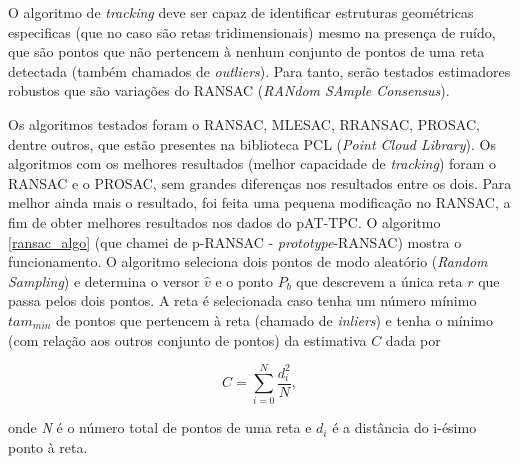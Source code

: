 \documentclass[a4paper,12pt,oneside]{book}
\begin{document}

\par O algoritmo de \textit{tracking} deve ser capaz de identificar estruturas geométricas especificas (que no caso são retas tridimensionais) mesmo na presença de ruído, que são pontos que não pertencem à nenhum conjunto de pontos de uma reta detectada (também chamados de \textit{outliers}). Para tanto, serão testados estimadores robustos que são variações do RANSAC (\textit{RANdom SAmple Consensus})\cite{ransac, artigo}.

\par Os algoritmos testados foram o RANSAC, MLESAC\cite{ref:MLESAC}, RRANSAC, PROSAC, dentre outros, que estão presentes na biblioteca PCL (\textit{Point Cloud Library})\cite{pcl}. Os algoritmos com os melhores resultados (melhor capacidade de \textit{tracking}) foram o RANSAC e o PROSAC, sem grandes diferenças nos resultados entre os dois. Para melhor ainda mais o resultado, foi feita uma pequena modificação no RANSAC, a fim de obter melhores resultados nos dados do pAT-TPC. O algoritmo \ref{ransac_algo} (que chamei de p-RANSAC - \textit{prototype}-RANSAC) mostra o funcionamento. O algoritmo seleciona dois pontos de modo aleatório (\textit{Random Sampling}) e determina o versor $\hat{v}$ e o ponto $P_b$ que descrevem a única reta $r$ que passa pelos dois pontos. A reta é selecionada caso tenha um número mínimo $tam_{min}$ de pontos que pertencem à reta (chamado de \textit{inliers}) e tenha o mínimo (com relação aos outros conjunto de pontos) da estimativa $C$ dada por

\begin{equation} \label{criterio_ransac}
    C = \sum_{i = 0}^{N} \frac{d_i ^2}{N},
\end{equation}

onde \textit{N} é o número total de pontos de uma reta e $d_i$ é a distância do i-ésimo ponto à reta.
\end{document}
